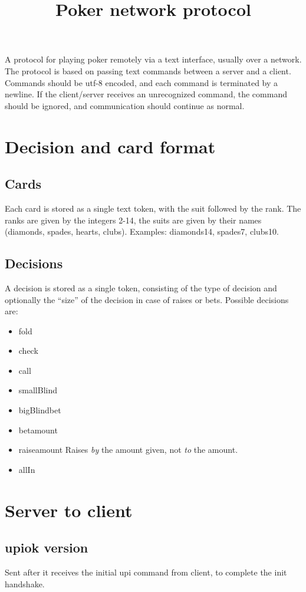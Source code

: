\documentclass{article}
\title{Poker network protocol}
\begin{document}
\maketitle

A protocol for playing poker remotely via a text interface, usually over a network. The protocol is based on passing text commands between a server and a client. Commands should be utf-8 encoded, and each command is terminated by a newline. If the client/server receives an unrecognized command, the command should be ignored, and communication should continue as normal.

\section{Decision and card format}
\subsection{Cards}
Each card is stored as a single text token, with the suit followed by the rank. The ranks are given by the integers 2-14, the suits are given by their names (diamonds, spades, hearts, clubs). Examples: diamonds14, spades7, clubs10.

\subsection{Decisions}
A decision is stored as a single token, consisting of the type of decision and optionally the ``size'' of the decision in case of raises or bets. Possible decisions are:

\begin{itemize}
\item fold
\item check
\item call
\item smallBlind
\item bigBlindbet
\item bet\textlangle{}amount\textrangle{} 
\item raise\textlangle{}amount\textrangle{} Raises \textit{by} the amount given, not \textit{to} the amount.
\item allIn
\end{itemize}

\section{Server to client}

\subsection{upiok \textlangle{}version\textrangle{}}
Sent after it receives the initial upi command from client, to complete the init handshake.
\end{document}
